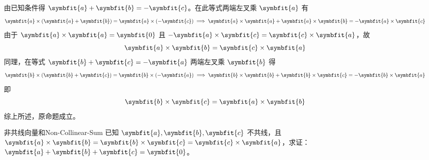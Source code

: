 \begin{myproof}
    由已知条件得 $\symbfit{a} + \symbfit{b} = -\symbfit{c}$。在此等式两端左叉乘 $\symbfit{a}$ 有
    \begin{equation*}
        \symbfit{a} \times (\symbfit{a} + \symbfit{b}) = \symbfit{a} \times (-\symbfit{c}) \implies \symbfit{a} \times \symbfit{a} + \symbfit{a} \times \symbfit{b} = -\symbfit{a} \times \symbfit{c}
    \end{equation*}
    由于 $\symbfit{a} \times \symbfit{a} = \symbfit{0}$ 且 $-\symbfit{a} \times \symbfit{c} = \symbfit{c} \times \symbfit{a}$，故
    \begin{equation*}
        \symbfit{a} \times \symbfit{b} = \symbfit{c} \times \symbfit{a}
    \end{equation*}
    同理，在等式 $\symbfit{b} + \symbfit{c} = -\symbfit{a}$ 两端左叉乘 $\symbfit{b}$ 得
    \begin{equation*}
        \symbfit{b} \times (\symbfit{b} + \symbfit{c}) = \symbfit{b} \times (-\symbfit{a}) \implies \symbfit{b} \times \symbfit{b} + \symbfit{b} \times \symbfit{c} = -\symbfit{b} \times \symbfit{a}
    \end{equation*}
    即
    \begin{equation*}
        \symbfit{b} \times \symbfit{c} = \symbfit{a} \times \symbfit{b}
    \end{equation*}
    综上所述，原命题成立。
\end{myproof}


\begin{problem}{非共线向量和}{Non-Collinear-Sum}
    已知 $\symbfit{a}, \symbfit{b}, \symbfit{c}$ 不共线，且 $\symbfit{a} \times \symbfit{b} = \symbfit{b} \times \symbfit{c} = \symbfit{c} \times \symbfit{a}$，求证：$\symbfit{a} + \symbfit{b} + \symbfit{c} = \symbfit{0}$。
\end{problem}

